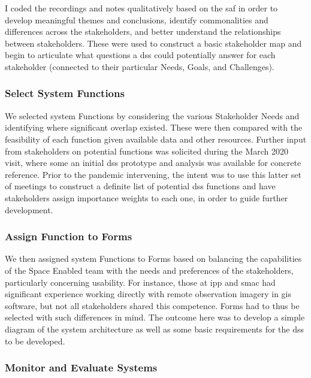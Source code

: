 I coded the recordings and notes qualitatively based on the \ac{saf} in order to develop meaningful themes and conclusions, identify commonalities and differences across the stakeholders, and better understand the relationships between stakeholders. These were used to construct a basic stakeholder map and begin to articulate what questions a \ac{dss} could potentially answer for each stakeholder (connected to their particular Needs, Goals, and Challenges). 

\subsubsection{Select System Functions}

We selected system Functions by considering the various Stakeholder Needs and identifying where significant overlap existed. These were then compared with the feasibility of each function given available data and other resources. Further input from stakeholders on potential functions was solicited during the March 2020 visit, where some an initial \ac{dss} prototype and analysis was available for concrete reference. Prior to the pandemic intervening, the intent was to use this latter set of meetings to construct a definite list of potential \ac{dss} functions and have stakeholders assign importance weights to each one, in order to guide further development.

\subsubsection{Assign Function to Forms}

We then assigned system Functions to Forms based on balancing the capabilities of the Space Enabled team with the needs and preferences of the stakeholders, particularly concerning usability. For instance, those at \ac{ipp} and \ac{smac} had significant experience working directly with remote observation imagery in \ac{gis} software, but not all stakeholders shared this competence. Forms had to thus be selected with such differences in mind. The outcome here was to develop a simple diagram of the system architecture as well as some basic requirements for the \ac{dss} to be developed.


\subsubsection{Monitor and Evaluate Systems} \label{sec:rio-monitor-method}


